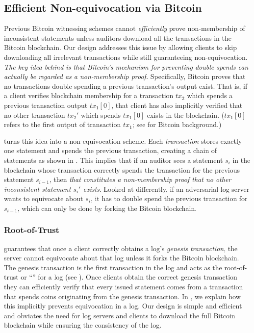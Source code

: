 \subsection{Efficient Non-equivocation via Bitcoin}

Previous Bitcoin witnessing schemes\cite{keybase,blockstack} cannot \emph{efficiently} prove non-membership of inconsistent statements unless auditors download all the transactions in the Bitcoin blockchain.
Our design addresses this issue by allowing \Sys clients to skip downloading all irrelevant transactions while still guaranteeing non-equivocation.
\emph{The key idea behind \Sys is that Bitcoin's mechanism for preventing double spends can actually be regarded as a non-membership proof.}
Specifically, Bitcoin proves that no transactions double spending a previous transaction's output exist.
That is, if a client verifies blockchain membership for a transaction $tx_2$ which spends a previous transaction output $tx_1[0]$, that client has also implicitly verified that no other transaction $tx_2'$ which spends $tx_1[0]$ exists in the blockchain. ($tx_1[0]$ refers to the first output of transaction $tx_1$; see  for Bitcoin background.)

\Sys turns this idea into a non-equivocation scheme.
Each \emph{\Sys transaction} stores exactly one statement and spends the previous \Sys transaction, creating a chain of statements as shown in .
This implies that if an auditor sees a statement $s_i$ in the blockchain whose transaction correctly spends the transaction for the previous statement $s_{i-1}$, then \emph{that constitutes a non-membership proof that no other inconsistent statement $s_i'$ exists}.
Looked at differently, if an adversarial log server wants to equivocate about $s_i$, it has to double spend the previous \Sys transaction for $s_{i-1}$, which can only be done by forking the Bitcoin blockchain.

\subsubsection{Root-of-Trust}
\Sys guarantees that once a client correctly obtains a log's \emph{genesis transaction}, the server cannot equivocate about that log unless it forks the Bitcoin blockchain.
The genesis transaction is the first transaction in the log and acts as the root-of-trust or ``\pk'' for a \Sys log (see ).
Once clients obtain the correct genesis transaction they can efficiently verify that every issued statement comes from a transaction that spends coins originating from the genesis transaction.
In , we explain how this implicitly prevents equivocation in a \Sys log.
Our design is simple and efficient and obviates the need for log servers and clients to download the full Bitcoin blockchain while ensuring the consistency of the log.

